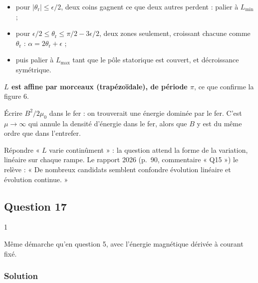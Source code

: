 \documentclass[11pt,a4paper]{article}
\providecommand{\tightlist}{\setlength{\itemsep}{0pt}\setlength{\parskip}{0pt}}
\begin{document}
\begin{itemize}
\tightlist
\item
  pour \(|\theta_{\mathrm r}|\le\epsilon/2\), deux coins gagnent ce que deux autres perdent : palier à \(L_{\min}\) ;
\item
  pour \(\epsilon/2\le\theta_{\mathrm r}\le\pi/2-3\epsilon/2\), deux zones seulement, croissant chacune comme \(\theta_{\mathrm r}\) : \(\alpha=2\theta_{\mathrm r}+\epsilon\) ;
\item
  puis palier à \(L_{\max}\) tant que le pôle statorique est couvert, et décroissance symétrique.
\end{itemize}

\textbf{\(L\) est affine par morceaux (trapézoïdale), de période \(\pi\)}, ce que confirme la figure 6.

\begin{piege}

Écrire \(B^2/2\mu_0\) dans le fer : on trouverait une énergie dominée par le fer. C'est \(\mu\to\infty\) qui annule la densité d'énergie dans le fer, alors que \(B\) y est du même ordre que dans l'entrefer.

\end{piege}

\begin{piege}

Répondre « \(L\) varie continûment » : la question attend la forme de la variation, linéaire sur chaque rampe. Le rapport 2026 (p.~90, commentaire « Q15 ») le relève : « De nombreux candidats semblent confondre évolution linéaire et évolution continue. »

\end{piege}

\hypertarget{question-17}{%
\subsection{Question 17}\label{question-17}}

\begin{indication}{1}

Même démarche qu'en question 5, avec l'énergie magnétique dérivée à courant fixé.

\end{indication}

\hypertarget{solution-16}{%
\subsubsection{Solution}\label{solution-16}}
\end{document}
